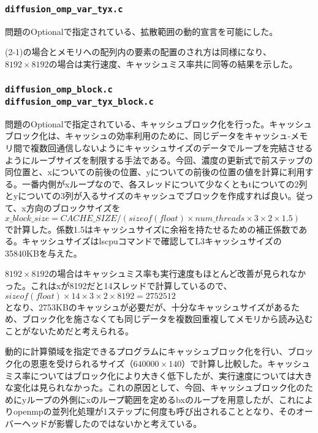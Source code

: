 \documentclass{jarticle}
\begin{document}
\subsubsection{\texttt{diffusion\_omp\_var\_tyx.c}}
問題のOptionalで指定されている、拡散範囲の動的宣言を可能にした。\par
(2-1)の場合とメモリへの配列内の要素の配置のされ方は同様になり、$8192\times8192$の場合は実行速度、キャッシュミス率共に同等の結果を示した。

\subsubsection{\texttt{diffusion\_omp\_block.c\\diffusion\_omp\_var\_tyx\_block.c}}
問題のOptionalで指定されている、キャッシュブロック化を行った。キャッシュブロック化は、キャッシュの効率利用のために、同じデータをキャッシュ-メモリ間で複数回通信しないようにキャッシュサイズのデータでループを完結させるようにルーブサイズを制限する手法である。今回、濃度の更新式で前ステップの同位置と、xについての前後の位置、yについての前後の位置の値を計算に利用する。一番内側がxループなので、各スレッドについて少なくともtについての2列とyについての3列が入るサイズのキャッシュでブロックを作成すれば良い。従って、x方向のブロックサイズを\\
$x\_block\_size = CACHE\_SIZE / (sizeof(float) \times num\_threads \times 3 \times 2 \times 1.5)$\\
で計算した。係数1.5はキャッシュサイズに余裕を持たせるための補正係数である。キャッシュサイズはlscpuコマンドで確認してL3キャッシュサイズの35840KBを与えた。\par
$8192\times8192$の場合はキャッシュミス率も実行速度もほとんど改善が見られなかった。これはxが8192だと14スレッドで計算しているので、\\
$sizeof(float)\times14\times3\times2\times8192=2752512$\\
となり、2753KBのキャッシュが必要だが、十分なキャッシュサイズがあるため、ブロック化を施さなくても同じデータを複数回重複してメモリから読み込むことがないためだと考えられる。\par
動的に計算領域を指定できるプログラムにキャッシュブロック化を行い、ブロック化の恩恵を受けられるサイズ（$640000\times140$）で計算し比較した。キャッシュミス率についてはブロック化により大きく低下したが、実行速度については大きな変化は見られなかった。これの原因として、今回、キャッシュブロック化のためにyループの外側にxのループ範囲を定めるbxのループを用意したが、これによりopenmpの並列化処理が1ステップに何度も呼び出されることとなり、そのオーバーヘッドが影響したのではないかと考えている。
\end{document}
